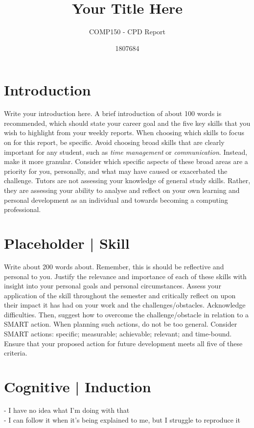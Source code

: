 \documentclass{scrartcl}
\title{Your Title Here}
\subtitle{COMP150 - CPD Report}
\author{1807684}
\begin{document}
\maketitle

\section{Introduction}

Write your introduction here. A brief introduction of about 100 words is recommended, which should state your career goal and the five key skills that you wish to highlight from your weekly reports. When choosing which skills to focus on for this report, be specific. Avoid choosing broad skills that are clearly important for any student, such as \textit{time management} or \textit{communication}. Instead, make it more granular. Consider which specific aspects of these broad areas are a priority for you, personally, and what may have caused or exacerbated the challenge. Tutors are not assessing your knowledge of general study skills. Rather, they are assessing your ability to analyse and reflect on your own learning and personal development as an individual and towards becoming a computing professional.\cite{shannon}

\section{Placeholder | Skill}

Write about 200 words about. Remember, this is should be reflective and personal to you. Justify the relevance and importance of each of these skills with insight into your personal goals and personal circumstances. Assess your application of the skill throughout the semester and critically reflect on upon their impact it has had on your work and the challenges/obstacles. Acknowledge difficulties. Then, suggest how to overcome the challenge/obstacle in relation to a SMART action. When planning such actions, do not be too general. Consider SMART actions:
specific; measurable; achievable; relevant; and time-bound. Ensure that your proposed action for future development meets all five of these criteria.\cite{shannon} %

\section{Cognitive | Induction}
- I have no idea what I'm doing with that\\
- I can follow it when it's being explained to me, but I struggle to reproduce it\\
\end{document}
